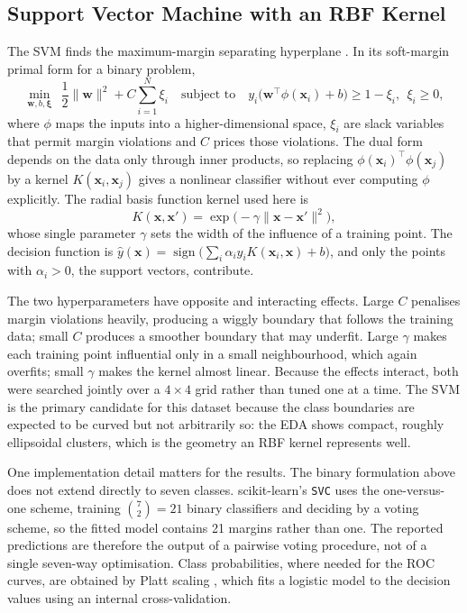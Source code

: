 \subsection{Support Vector Machine with an RBF Kernel}

The SVM finds the maximum-margin separating hyperplane \cite{cortes1995}. In its soft-margin primal
form for a binary problem,
\begin{equation}
  \min_{\mathbf{w}, b, \boldsymbol{\xi}}\ \
  \frac{1}{2}\|\mathbf{w}\|^{2} + C\sum_{i=1}^{N}\xi_i
  \quad\text{subject to}\quad
  y_i\big(\mathbf{w}^{\top}\phi(\mathbf{x}_i) + b\big) \ge 1 - \xi_i,\ \
  \xi_i \ge 0,
  \label{eq:svm-primal}
\end{equation}
where $\phi$ maps the inputs into a higher-dimensional space, $\xi_i$ are slack
variables that permit margin violations and $C$ prices those violations. The dual
form depends on the data only through inner products, so replacing
$\phi(\mathbf{x}_i)^{\top}\phi(\mathbf{x}_j)$ by a kernel $K(\mathbf{x}_i,
\mathbf{x}_j)$ gives a nonlinear classifier without ever computing $\phi$
explicitly. The radial basis function kernel used here is
\begin{equation}
  K(\mathbf{x}, \mathbf{x}') =
  \exp\!\big(-\gamma\|\mathbf{x} - \mathbf{x}'\|^{2}\big),
  \label{eq:rbf}
\end{equation}
whose single parameter $\gamma$ sets the width of the influence of a training
point. The decision function is
$\hat{y}(\mathbf{x}) = \operatorname{sign}\big(\sum_i \alpha_i y_i
K(\mathbf{x}_i, \mathbf{x}) + b\big)$, and only the points with $\alpha_i > 0$,
the support vectors, contribute.

The two hyperparameters have opposite and interacting effects. Large $C$ penalises
margin violations heavily, producing a wiggly boundary that follows the training
data; small $C$ produces a smoother boundary that may underfit. Large $\gamma$
makes each training point influential only in a small neighbourhood, which again
overfits; small $\gamma$ makes the kernel almost linear. Because the effects
interact, both were searched jointly over a $4\times4$ grid rather than tuned one
at a time. The SVM is the primary candidate for this dataset because the class
boundaries are expected to be curved but not arbitrarily so: the EDA shows
compact, roughly ellipsoidal clusters, which is the geometry an RBF kernel
represents well.

One implementation detail matters for the results. The binary formulation above
does not extend directly to seven classes. scikit-learn's \texttt{SVC} uses the
one-versus-one scheme, training $\binom{7}{2} = 21$ binary classifiers and
deciding by a voting scheme, so the fitted model contains 21 margins rather than
one. The reported predictions are therefore the output of a pairwise voting
procedure, not of a single seven-way optimisation. Class probabilities, where
needed for the ROC curves, are obtained by Platt scaling \cite{platt1999}, which
fits a logistic model to the decision values using an internal cross-validation.

